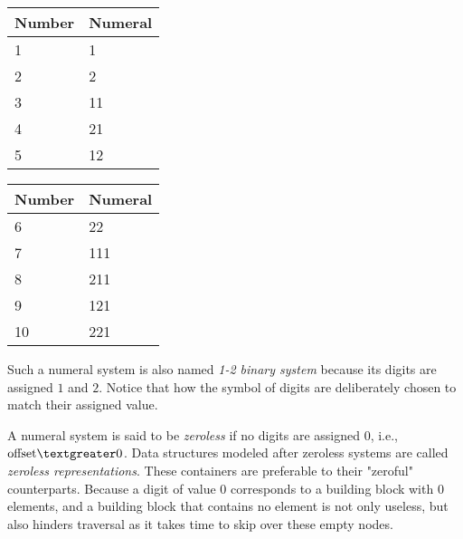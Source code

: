 \documentclass[../thesis.tex]{subfiles}
\begin{document}
\begin{center}
    \begin{adjustbox}{max width=\textwidth}
    \begin{tabular}{ | l | l |}
    \textbf{Number} & \textbf{Numeral} \\
    \hline
    1 & 1  \\
    2 & 2  \\
    3 & 11 \\
    4 & 21 \\
    5 & 12 \\
    \end{tabular}
    \quad
    \begin{tabular}{ | l | l | }
    \textbf{Number} & \textbf{Numeral} \\
    \hline
    6  & 22 \\
    7  & 111 \\
    8  & 211 \\
    9  & 121 \\
    10 & 221 \\
    \end{tabular}
    \end{adjustbox}
\end{center}

Such a numeral system is also named \textit{1-2 binary system} because its digits
are assigned $ 1 $ and $ 2 $.
Notice that how the symbol of digits are deliberately chosen to match their assigned value.


A numeral system is said to be \textit{zeroless} if no digits are assigned $ 0 $,
i.e., $ \text{offset} \textgreater 0 $.
Data structures modeled after zeroless systems are called \textit{zeroless representations}.
These containers are preferable to their "zeroful" counterparts.
Because a digit of value $ 0 $ corresponds to a building block with $ 0 $ elements,
and a building block that contains no element is not only useless,
but also hinders traversal as it takes time to skip over these empty nodes.
\end{document}
